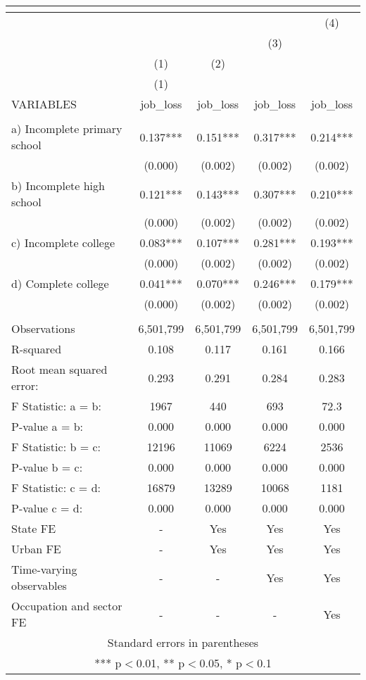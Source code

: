 \begin{tabular}{lcccc}
\multicolumn{5}{c}{} \\ \hline
 &  &  &  & (4) \\
 &  &  & (3) &  \\
 & (1) & (2) &  &  \\
 & (1) &  &  &  \\
VARIABLES & job\_loss & job\_loss & job\_loss & job\_loss \\ \hline
 &  &  &  &  \\
a) Incomplete primary school & 0.137*** & 0.151*** & 0.317*** & 0.214*** \\
 & (0.000) & (0.002) & (0.002) & (0.002) \\
b) Incomplete high school & 0.121*** & 0.143*** & 0.307*** & 0.210*** \\
 & (0.000) & (0.002) & (0.002) & (0.002) \\
c) Incomplete college & 0.083*** & 0.107*** & 0.281*** & 0.193*** \\
 & (0.000) & (0.002) & (0.002) & (0.002) \\
d) Complete college & 0.041*** & 0.070*** & 0.246*** & 0.179*** \\
 & (0.000) & (0.002) & (0.002) & (0.002) \\
 &  &  &  &  \\
Observations & 6,501,799 & 6,501,799 & 6,501,799 & 6,501,799 \\
R-squared & 0.108 & 0.117 & 0.161 & 0.166 \\
Root mean squared error: & 0.293 & 0.291 & 0.284 & 0.283 \\
F Statistic: a = b: & 1967 & 440 & 693 & 72.3 \\
\hspace{1mm} P-value a = b: & 0.000 & 0.000 & 0.000 & 0.000 \\
F Statistic: b = c: & 12196 & 11069 & 6224 & 2536 \\
\hspace{1mm} P-value b = c: & 0.000 & 0.000 & 0.000 & 0.000 \\
F Statistic: c = d: & 16879 & 13289 & 10068 & 1181 \\
\hspace{1mm} P-value c = d: & 0.000 & 0.000 & 0.000 & 0.000 \\
State FE & - & Yes & Yes & Yes \\
Urban FE & - & Yes & Yes & Yes \\
Time-varying observables & - & - & Yes & Yes \\
 Occupation and sector FE & - & - & - & Yes \\ \hline
\multicolumn{5}{c}{ Standard errors in parentheses} \\
\multicolumn{5}{c}{ *** p$<$0.01, ** p$<$0.05, * p$<$0.1} \\
\end{tabular}
